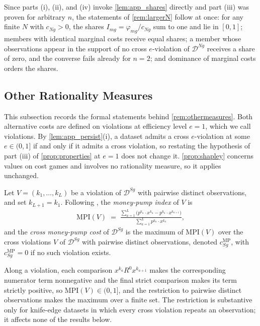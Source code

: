 \documentclass[11 pt]{article}
\begin{document}
Since parts (i), (ii), and (iv) invoke \autoref{lem:app_shares} directly and part (iii) was proven for arbitrary $n$, the statements of \autoref{rem:largerN} follow at once: for any finite $N$ with $c_{Ng} > 0$, the shares $I_{mg} = \varphi_{mg}/c_{Ng}$ sum to one and lie in $[0,1]$; members with identical marginal costs receive equal shares; a member whose observations appear in the support of no cross $e$-violation of $\mathcal{D}^{Ng}$ receives a share of zero, and the converse fails already for $n = 2$; and dominance of marginal costs orders the shares.

\subsection{Other Rationality Measures}\label{subsec:app_othermeasures}

This subsection records the formal statements behind \autoref{rem:othermeasures}. Both alternative costs are defined on violations at efficiency level $e = 1$, which we call violations. By \autoref{lem:app_persist}(i), a dataset admits a cross $e$-violation at some $e \in (0,1]$ if and only if it admits a cross violation, so restating the hypothesis of part (iii) of \autoref{prop:properties} at $e = 1$ does not change it. \autoref{prop:shapley} concerns values on cost games and involves no rationality measure, so it applies unchanged.

\begin{definition}\label{def:app_mp}
Let $V = (k_1, \dots, k_L)$ be a violation of $\mathcal{D}^{Sg}$ with pairwise distinct observations, and set $k_{L+1} = k_1$. Following \citet{echenique2011money}, the \emph{money-pump index} of $V$ is
\begin{align*}
\mathrm{MPI}(V) \;=\; \frac{\sum_{a=1}^{L} \bigl( p^{k_a} \cdot x^{k_a} - p^{k_a} \cdot x^{k_{a+1}} \bigr)}{\sum_{a=1}^{L} p^{k_a} \cdot x^{k_a}},
\end{align*}
and the \emph{cross money-pump cost} of $\mathcal{D}^{Sg}$ is the maximum of $\mathrm{MPI}(V)$ over the cross violations $V$ of $\mathcal{D}^{Sg}$ with pairwise distinct observations, denoted $c^{\mathrm{MP}}_{Sg}$, with $c^{\mathrm{MP}}_{Sg} = 0$ if no such violation exists.
\end{definition}

Along a violation, each comparison $x^{k_a} \mathrel{R^{0}} x^{k_{a+1}}$ makes the corresponding numerator term nonnegative and the final strict comparison makes its term strictly positive, so $\mathrm{MPI}(V) \in (0,1]$, and the restriction to pairwise distinct observations makes the maximum over a finite set. The restriction is substantive only for knife-edge datasets in which every cross violation repeats an observation; it affects none of the results below.
\end{document}
